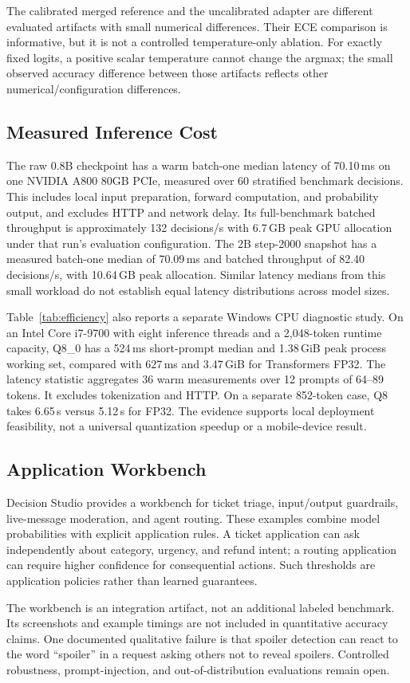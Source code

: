 The calibrated merged reference and the uncalibrated adapter are different evaluated artifacts with small numerical differences. Their ECE comparison is informative, but it is not a controlled temperature-only ablation. For exactly fixed logits, a positive scalar temperature cannot change the argmax; the small observed accuracy difference between those artifacts reflects other numerical/configuration differences.

\subsection{Measured Inference Cost}

The raw 0.8B checkpoint has a warm batch-one median latency of 70.10\,ms on one NVIDIA A800 80GB PCIe, measured over 60 stratified benchmark decisions. This includes local input preparation, forward computation, and probability output, and excludes HTTP and network delay. Its full-benchmark batched throughput is approximately 132 decisions/s with 6.7\,GB peak GPU allocation under that run's evaluation configuration. The 2B step-2000 snapshot has a measured batch-one median of 70.09\,ms and batched throughput of 82.40 decisions/s, with 10.64\,GB peak allocation. Similar latency medians from this small workload do not establish equal latency distributions across model sizes.

Table~\ref{tab:efficiency} also reports a separate Windows CPU diagnostic study. On an Intel Core i7-9700 with eight inference threads and a 2,048-token runtime capacity, Q8\_0 has a 524\,ms short-prompt median and 1.38\,GiB peak process working set, compared with 627\,ms and 3.47\,GiB for Transformers FP32. The latency statistic aggregates 36 warm measurements over 12 prompts of 64--89 tokens. It excludes tokenization and HTTP. On a separate 852-token case, Q8 takes 6.65\,s versus 5.12\,s for FP32. The evidence supports local deployment feasibility, not a universal quantization speedup or a mobile-device result.

\subsection{Application Workbench}
Decision Studio provides a workbench for ticket triage, input/output guardrails, live-message moderation, and agent routing. These examples combine model probabilities with explicit application rules. A ticket application can ask independently about category, urgency, and refund intent; a routing application can require higher confidence for consequential actions. Such thresholds are application policies rather than learned guarantees.

The workbench is an integration artifact, not an additional labeled benchmark. Its screenshots and example timings are not included in quantitative accuracy claims. One documented qualitative failure is that spoiler detection can react to the word ``spoiler'' in a request asking others not to reveal spoilers. Controlled robustness, prompt-injection, and out-of-distribution evaluations remain open.
